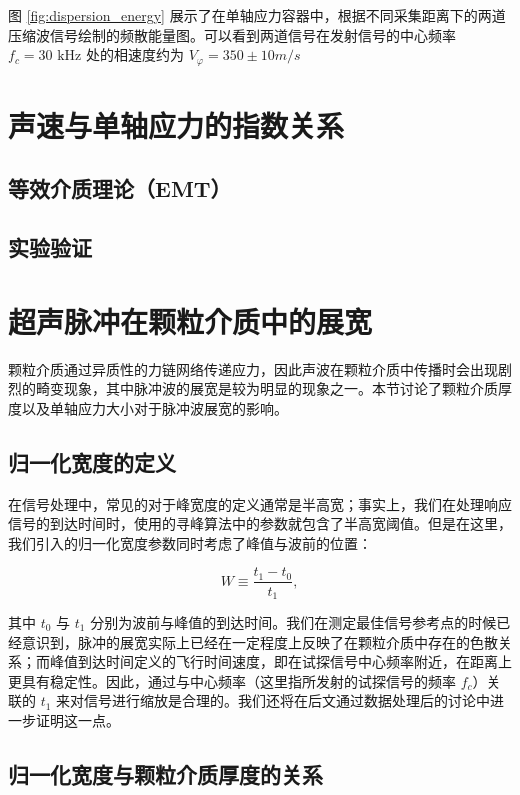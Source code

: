 图 \ref{fig:dispersion_energy} 展示了在单轴应力容器中，根据不同采集距离下的两道压缩波信号绘制的频散能量图。可以看到两道信号在发射信号的中心频率 $f_{c} = 30\text{ kHz}$ 处的相速度约为 $V_{\varphi} = 350\pm 10\unit{m/s}$

\section{声速与单轴应力的指数关系}

\subsection{等效介质理论（EMT）}

\subsection{实验验证}

\section{超声脉冲在颗粒介质中的展宽}

颗粒介质通过异质性的力链网络传递应力，因此声波在颗粒介质中传播时会出现剧烈的畸变现象，其中脉冲波的展宽是较为明显的现象之一。本节讨论了颗粒介质厚度以及单轴应力大小对于脉冲波展宽的影响。

\subsection{归一化宽度的定义}

在信号处理中，常见的对于峰宽度的定义通常是半高宽；事实上，我们在处理响应信号的到达时间时，使用的寻峰算法中的参数就包含了半高宽阈值。但是在这里，我们引入的归一化宽度参数同时考虑了峰值与波前的位置：

\begin{equation}
  W \equiv \frac{t_{1}-t_{0}}{t_{1}},
\end{equation}

其中 $t_{0}$ 与 $t_{1}$ 分别为波前与峰值的到达时间。我们在测定最佳信号参考点的时候已经意识到，脉冲的展宽实际上已经在一定程度上反映了在颗粒介质中存在的色散关系；而峰值到达时间定义的飞行时间速度，即在试探信号中心频率附近，在距离上更具有稳定性。因此，通过与中心频率（这里指所发射的试探信号的频率 $f_{c}$）关联的 $t_{1}$ 来对信号进行缩放是合理的。我们还将在后文通过数据处理后的讨论中进一步证明这一点。

\subsection{归一化宽度与颗粒介质厚度的关系}

